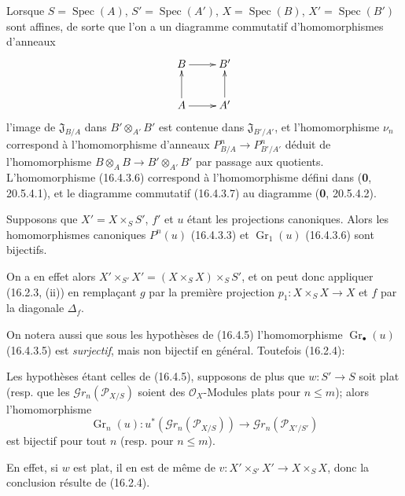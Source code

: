 \begin{env}[16.4.4]
\label{IV.16.4.4}
Lorsque $S=\operatorname{Spec}(A)$, $S'=\operatorname{Spec}(A')$,
$X=\operatorname{Spec}(B)$, $X'=\operatorname{Spec}(B')$ sont affines, de sorte
que l'on a un diagramme commutatif d'homomorphismes d'anneaux
\[
  \xymatrix{
    B \ar[r] & B' \\
    A \ar[u] \ar[r] & A' \ar[u]
  }
\]
l'image de $\mathfrak{J}_{B/A}$ dans $B'\otimes_{A'}B'$ est contenue dans
$\mathfrak{J}_{B'/A'}$, et l'homomorphisme $\nu_n$ correspond à
l'homomorphisme d'anneaux $P_{B/A}^n\to P_{B'/A'}^n$ déduit de l'homomorphisme
$B\otimes_A B\to B'\otimes_{A'}B'$ par passage aux quotients. L'homomorphisme
(16.4.3.6) correspond à l'homomorphisme défini dans (\textbf{0}, 20.5.4.1), et le
diagramme commutatif (16.4.3.7) au diagramme (\textbf{0}, 20.5.4.2).
\end{env}

\begin{proposition}[16.4.5]
\label{IV.16.4.5}
Supposons que $X'=X\times_S S'$, $f'$ et $u$ étant les projections canoniques.
Alors les homomorphismes canoniques $P^n(u)$ \textup{(16.4.3.3)} et
$\operatorname{Gr}_1(u)$ \textup{(16.4.3.6)} sont bijectifs.
\end{proposition}

On a en effet alors $X'\times_{S'}X'=(X\times_S X)\times_S S'$, et on peut donc
appliquer (16.2.3, (ii)) en remplaçant $g$ par la première projection
$p_1:X\times_S X\to X$ et $f$ par la diagonale $\Delta_f$.

On notera aussi que sous les hypothèses de (16.4.5) l'homomorphisme
$\operatorname{Gr}_\bullet(u)$ (16.4.3.5) est \emph{surjectif}, mais non bijectif en
général. Toutefois (16.2.4):

\begin{corollary}[16.4.6]
\label{IV.16.4.6}
Les hypothèses étant celles de \textup{(16.4.5)}, supposons de plus que $w:S'\to S$ soit
plat \textup{(resp.} que les $\mathscr{G}r_n(\mathscr{P}_{X/S})$ soient des
$\mathcal{O}_X$-Modules plats pour $n\leq m$); alors l'homomorphisme
\[
  \operatorname{Gr}_n(u):u^*(\mathscr{G}r_n(\mathscr{P}_{X/S}))
  \longrightarrow\mathscr{G}r_n(\mathscr{P}_{X'/S'})
\]
est bijectif pour tout $n$ \textup{(resp.} pour $n\leq m$).
\end{corollary}

En effet, si $w$ est plat, il en est de même de
$v:X'\times_{S'}X'\to X\times_S X$, donc la conclusion résulte de (16.2.4).

